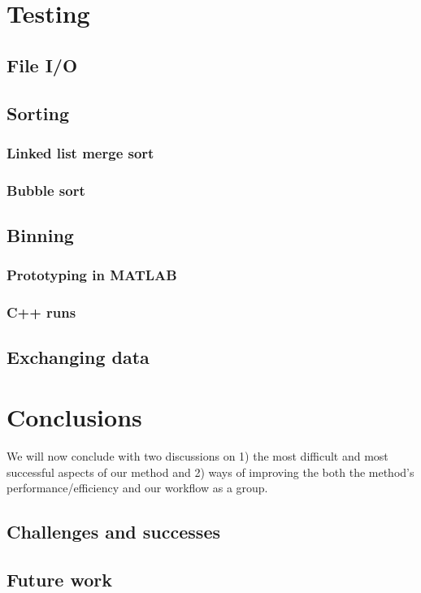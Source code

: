 \documentclass{article}
\begin{document}
\section{Testing}


\subsection{File I/O}

\subsection{Sorting}
\subsubsection{Linked list merge sort}
\subsubsection{Bubble sort}

\subsection{Binning}
\subsubsection{Prototyping in MATLAB}
\subsubsection{C++ runs}

\subsection{Exchanging data}



\section{Conclusions}
We will now conclude with two discussions on 1) the most difficult and most successful aspects of our method and 2) ways of improving the both the method's performance/efficiency and our workflow as a group.

\subsection{Challenges and successes}


\subsection{Future work}



\end{document}
